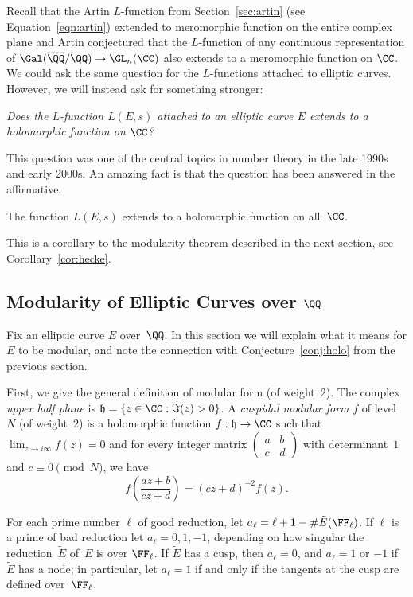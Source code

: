 Recall that the Artin $L$-function from Section~\ref{sec:artin}
(see Equation~\ref{eqn:artin}) extended to meromorphic function
on the entire complex plane and Artin conjectured that the $L$-function
of any continuous representation of $\Gal(\overline{\QQ}/\QQ) \to \GL_n(\CC)$ also
extends to a meromorphic function on $\CC$. We could ask the same
question for the $L$-functions attached to elliptic curves. However,
we will instead ask for something stronger:
\begin{center}
  \emph{Does the $L$-function $L(E,s)$ attached to an
    elliptic curve $E$ extends to a holomorphic function on $\CC$?}
\end{center}
This question was one of the central topics
in number theory in the late 1990s and early 2000s.
An amazing fact is that the question has been answered
in the affirmative.
\begin{theorem}\label{conj:holo}
  The function $L(E,s)$ extends to a holomorphic
  function on all~$\CC$.
\end{theorem}
This is a corollary to the modularity theorem described
in the next section, see Corollary~\ref{cor:hecke}.

\subsection{Modularity of Elliptic Curves over $\QQ$}

Fix an elliptic curve $E$ over~$\QQ$.  In this section we will explain
what it means for $E$ to be modular, and note the connection with
Conjecture~\ref{conj:holo} from the previous section.

First, we give the general definition of modular form (of weight~$2$).
The complex {\em upper half plane} is
$\mathfrak{h}  = \{z  \in \CC : \Im(z) > 0\}$.
A {\em cuspidal modular form} $f$ of level~$N$ (of weight~$2$) is a holomorphic
function $f : \mathfrak{h} \to \CC$ such that $\lim_{z\to i\infty} f(z) = 0$ and
for every integer matrix $\begin{pmatrix} a & b \\ c & d \end{pmatrix}$ with 
determinant~$1$ and $c\equiv 0 \pmod{N}$, we have
\[
  f\left( \frac{az + b}{cz + d} \right) = (cz+d)^{-2} f(z).
\]

For each prime number $\ell$ of good reduction, let $a_\ell = \ell+1 -
\#\tilde{E}(\FF_\ell)$.  If $\ell$ is a prime of bad reduction let
$a_\ell = 0,1,-1$, depending on how singular the reduction~$\tilde{E}$
of~$E$ is over $\FF_\ell$.  If $\tilde{E}$ has a cusp, then $a_\ell=0$,
and $a_\ell=1$ or $-1$ if $\tilde{E}$ has a node; in particular,
let $a_\ell=1$ if and only if the tangents at the cusp are defined
over~$\FF_\ell$.

